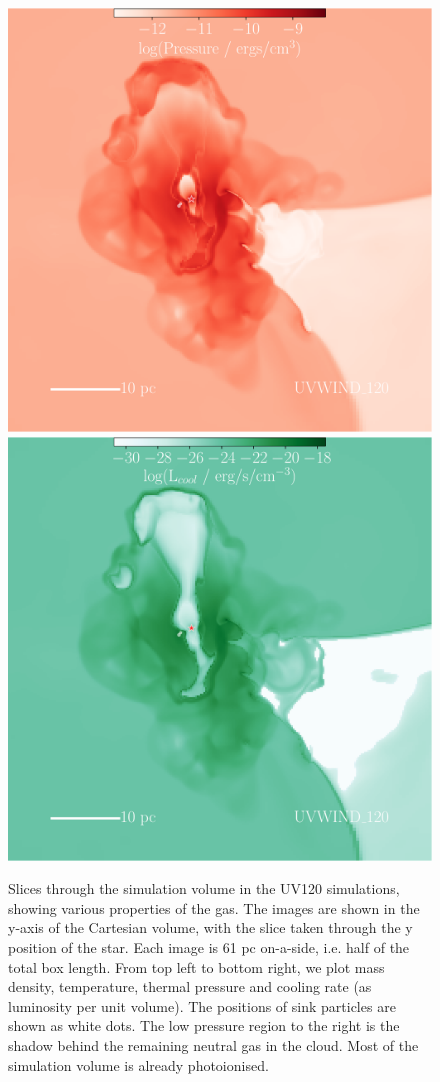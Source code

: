 \documentclass[a4paper,fleqn,usenatbib]{mnras}
\begin{document}
\begin{figure}
	\centerline{\includegraphics[width=0.80\columnwidth]{../plots/vis/slice/sliceTime_P_windset_120Msun0p2Myr_zoom0p5__ywindonly.pdf}
	\includegraphics[width=0.80\columnwidth]{../plots/vis/slice/sliceTime_Lcool_windset_120Msun0p2Myr_zoom0p5__ywindonly.pdf}}
	\caption{Slices through the simulation volume in the UV120 simulations, showing various properties of the gas. The images are shown in the y-axis of the Cartesian volume, with the slice taken through the y position of the star. Each image is 61 pc on-a-side, i.e. half of the total box length. From top left to bottom right, we plot mass density, temperature, thermal pressure and cooling rate (as luminosity per unit volume). The positions of sink particles are shown as white dots. The low pressure region to the right is the shadow behind the remaining neutral gas in the cloud. Most of the simulation volume is already photoionised.}
	\label{fig:windslices}
\end{figure}
\end{document}
